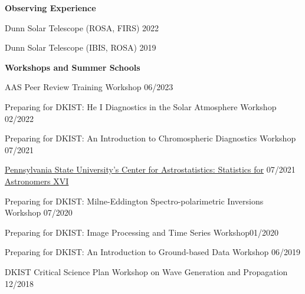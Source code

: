 \documentclass{resume} %
\begin{document}

\vspace{-0.1in}
\begin{rSection}{\textbf{Observing Experience}}
\vspace{0.02in}

{Dunn Solar Telescope (ROSA, FIRS)} \hfill{2022}

{Dunn Solar Telescope (IBIS, ROSA)} \hfill{2019}

\end{rSection} 


\vspace{-0.1in}
\begin{rSection}{\textbf{Workshops and Summer Schools}}
\vspace{0.02in}

{AAS Peer Review Training Workshop \hfill{06/2023}}

{Preparing for DKIST: He I Diagnostics in the Solar Atmosphere Workshop \hfill{02/2022}} 

{Preparing for DKIST: An Introduction to Chromospheric Diagnostics Workshop} \hfill{07/2021}

{\href{https://drive.google.com/file/d/1-ggYRQ9l34MkbHcc7GLWBdHFn_ISuwmg/view?usp=sharing}{Pennsylvania State University's Center for Astrostatistics: Statistics for} \hfill{07/2021}} \\ {\href{https://drive.google.com/file/d/1-ggYRQ9l34MkbHcc7GLWBdHFn_ISuwmg/view?usp=sharing}{Astronomers XVI} }

{Preparing for DKIST: Milne-Eddington Spectro-polarimetric Inversions Workshop \hfill{07/2020}}

{Preparing for DKIST: Image Processing and Time Series Workshop\hfill{01/2020}}

{Preparing for DKIST: An Introduction to Ground-based Data  Workshop \hfill{06/2019}}

{DKIST Critical Science Plan Workshop on 
Wave Generation and Propagation \hfill{12/2018}}
\end{rSection} 


\end{document}
